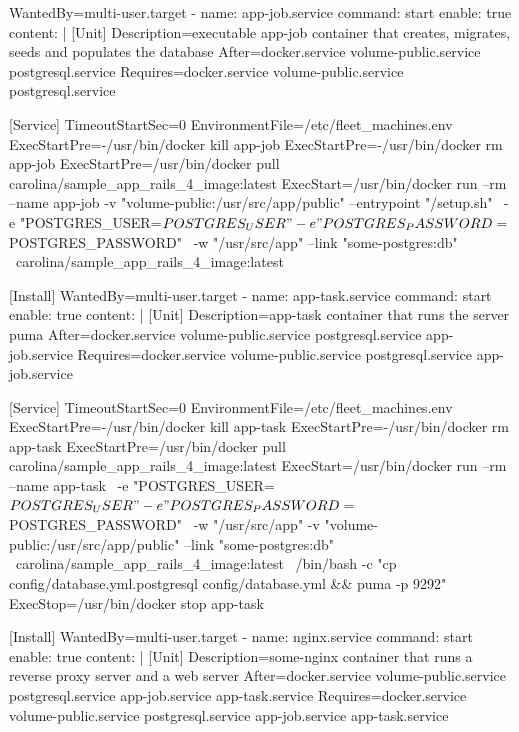 \begin{codelisting}
\begin{code}
      [Install] 
      WantedBy=multi-user.target
  - name: app-job.service
    command: start
    enable: true
    content: |
      [Unit] 
      Description=executable app-job container that creates, migrates, seeds and populates the database
      After=docker.service volume-public.service postgresql.service
      Requires=docker.service volume-public.service postgresql.service

      [Service] 
      TimeoutStartSec=0 
      EnvironmentFile=/etc/fleet_machines.env
      ExecStartPre=-/usr/bin/docker kill app-job 
      ExecStartPre=-/usr/bin/docker rm app-job 
      ExecStartPre=/usr/bin/docker pull carolina/sample_app_rails_4_image:latest 
      ExecStart=/usr/bin/docker run --rm --name app-job -v "volume-public:/usr/src/app/public" --entrypoint "/setup.sh" \
      -e "POSTGRES_USER=${POSTGRES_USER}" -e "POSTGRES_PASSWORD=${POSTGRES_PASSWORD}" \
      -w "/usr/src/app" --link "some-postgres:db" \
      carolina/sample_app_rails_4_image:latest

      [Install] 
      WantedBy=multi-user.target
  - name: app-task.service
    command: start
    enable: true
    content: |
      [Unit] 
      Description=app-task container that runs the server puma
      After=docker.service volume-public.service postgresql.service app-job.service
      Requires=docker.service volume-public.service postgresql.service app-job.service

      [Service] 
      TimeoutStartSec=0 
      EnvironmentFile=/etc/fleet_machines.env
      ExecStartPre=-/usr/bin/docker kill app-task 
      ExecStartPre=-/usr/bin/docker rm app-task
      ExecStartPre=/usr/bin/docker pull carolina/sample_app_rails_4_image:latest 
      ExecStart=/usr/bin/docker run --rm --name app-task \
      -e "POSTGRES_USER=${POSTGRES_USER}" -e "POSTGRES_PASSWORD=${POSTGRES_PASSWORD}" \
      -w "/usr/src/app" -v "volume-public:/usr/src/app/public" --link "some-postgres:db" \
      carolina/sample_app_rails_4_image:latest \
      /bin/bash -c "cp config/database.yml.postgresql config/database.yml && puma -p 9292"
      ExecStop=/usr/bin/docker stop app-task

      [Install] 
      WantedBy=multi-user.target
  - name: nginx.service
    command: start
    enable: true
    content: |
      [Unit] 
      Description=some-nginx container that runs a reverse proxy server and a web server
      After=docker.service volume-public.service postgresql.service app-job.service app-task.service
      Requires=docker.service volume-public.service postgresql.service app-job.service app-task.service


\end{code}
\end{codelisting}
